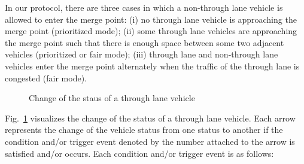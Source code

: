 \documentclass[10pt, conference, compsocconf]{IEEEtran}
\begin{document}

In our protocol, there are three cases in which a non-through lane
vehicle is allowed to enter the merge point: (i) no through lane
vehicle is approaching the merge point (prioritized mode); (ii) some through lane
vehicles are approaching the merge point such that there is enough
space between some two adjacent vehicles (prioritized or fair mode); (iii) through lane and
non-through lane vehicles enter the merge point alternately when the
traffic of the through lane is congested (fair mode).


\begin{figure}[h]
\begin{center}
\end{center}
\caption{Change of the staus of a through lane vehicle}
\label{throughLaneStatus}
\end{figure}

Fig.~\ref{throughLaneStatus} visualizes the change of the status of a
through lane vehicle.  Each arrow represents the change of the vehicle
status from one status to another if the condition and/or trigger
event denoted by the number attached to the arrow is satisfied and/or
occurs.  Each condition and/or trigger event is as follows:
\end{document}
